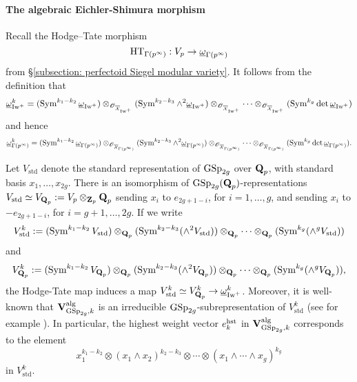 \paragraph{The algebraic Eichler-Shimura morphism}
Recall the Hodge--Tate morphism \[
    \operatorname{HT}_{\Gamma(p^{\infty})}: V_p \rightarrow \underline{\omega}_{\Gamma(p^{\infty})}
\] from \S \ref{subsection: perfectoid Siegel modular variety}. It follows from the definition that 
$$
        \underline{\omega}_{\operatorname{Iw}^+}^k = (\operatorname{Sym}^{k_1-k_2}\underline{\omega}_{\operatorname{Iw}^+})\otimes_{\operatorname{\mathscr{O}}_{\overline{\operatorname{\mathcal{X}}}_{\operatorname{Iw}^+}}} (\operatorname{Sym}^{k_2-k_3}\wedge^2 \underline{\omega}_{\operatorname{Iw}^+}) \otimes_{\operatorname{\mathscr{O}}_{\overline{\operatorname{\mathcal{X}}}_{\operatorname{Iw}^+}}} \cdots \otimes_{\operatorname{\mathscr{O}}_{\overline{\operatorname{\mathcal{X}}}_{\operatorname{Iw}^+}}} (\operatorname{Sym}^{k_g}\det \underline{\omega}_{\operatorname{Iw}^+})
$$
and hence
$$
        \underline{\omega}_{\Gamma(p^{\infty})}^k = (\operatorname{Sym}^{k_1-k_2}\underline{\omega}_{\Gamma(p^{\infty})})\otimes_{\operatorname{\mathscr{O}}_{\overline{\operatorname{\mathcal{X}}}_{\Gamma(p^{\infty})}}} (\operatorname{Sym}^{k_2-k_3}\wedge^2 \underline{\omega}_{\Gamma(p^{\infty})}) \otimes_{\operatorname{\mathscr{O}}_{\overline{\operatorname{\mathcal{X}}}_{\Gamma(p^{\infty})}}} \cdots \otimes_{\operatorname{\mathscr{O}}_{\overline{\operatorname{\mathcal{X}}}_{\Gamma(p^{\infty})}}} (\operatorname{Sym}^{k_g}\det \underline{\omega}_{\Gamma(p^{\infty})}).
$$

Let $V_{\mathrm{std}}$ denote the standard representation of $\operatorname{GSp}_{2g}$ over $\operatorname{\mathbf{Q}}_p$, with standard basis $x_1, \ldots, x_{2g}$. There is an isomorphism of $\operatorname{GSp}_{2g}(\operatorname{\mathbf{Q}}_p)$-representations $V_{\mathrm{std}}\simeq V_{\operatorname{\mathbf{Q}}_p}:=V_p\otimes_{\operatorname{\mathbf{Z}}_p}\operatorname{\mathbf{Q}}_p$ sending $x_i$ to $e_{2g+1-i}$, for $i=1, \ldots, g$, and sending $x_i$ to $-e_{2g+1-i}$, for $i=g+1, \ldots, 2g$. If we write
$$
 V_{\mathrm{std}}^{k}:=(\operatorname{Sym}^{k_1-k_2}V_{\mathrm{std}}) \otimes_{\operatorname{\mathbf{Q}}_p} (\operatorname{Sym}^{k_2-k_3}(\wedge^2 V_{\mathrm{std}}))\otimes_{\operatorname{\mathbf{Q}}_p} \cdots \otimes_{\operatorname{\mathbf{Q}}_p} (\operatorname{Sym}^{k_g}(\wedge^gV_{\mathrm{std}}))
$$
and
$$
 V_{\operatorname{\mathbf{Q}}_p}^{k}:=(\operatorname{Sym}^{k_1-k_2}V_{\operatorname{\mathbf{Q}}_p}) \otimes_{\operatorname{\mathbf{Q}}_p} (\operatorname{Sym}^{k_2-k_3}(\wedge^2 V_{\operatorname{\mathbf{Q}}_p}))\otimes_{\operatorname{\mathbf{Q}}_p} \cdots \otimes_{\operatorname{\mathbf{Q}}_p} (\operatorname{Sym}^{k_g}(\wedge^gV_{\operatorname{\mathbf{Q}}_p})),
$$
the Hodge-Tate map induces a map $V_{\mathrm{std}}^{k}\simeq V_{\operatorname{\mathbf{Q}}_p}^{k}\rightarrow \underline{\omega}_{\operatorname{Iw}^+}^k$. Moreover, it is well-known that $\operatorname{\mathbf{V}}_{\operatorname{GSp}_{2g}, k}^{\operatorname{alg}}$ is an irreducible $\operatorname{GSp}_{2g}$-subrepresentation of $V_{\mathrm{std}}^{k}$ (see for example \cite[Lecture 17]{Fulton-Harris}). In particular, the highest weight vector $e^{\operatorname{hst}}_k$ in $\operatorname{\mathbf{V}}_{\operatorname{GSp}_{2g}, k}^{\operatorname{alg}}$ corresponds to the element
$$
x_1^{k_1-k_2}\otimes (x_1\wedge x_2)^{k_2-k_3}\otimes\cdots \otimes (x_1\wedge \cdots \wedge x_g)^{k_g}
$$
in $V_{\mathrm{std}}^k$.

